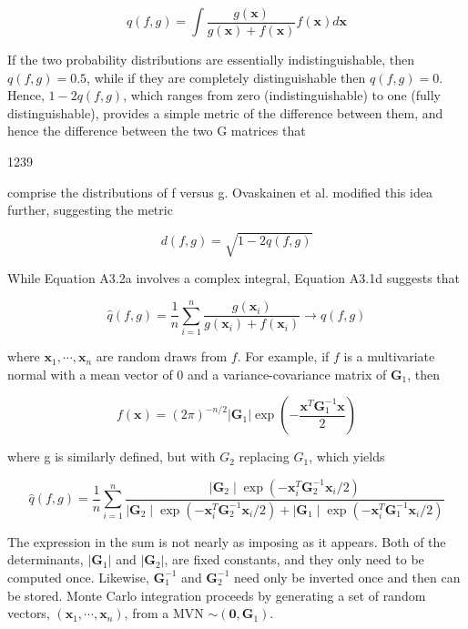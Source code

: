 \documentclass{article}
\begin{document}
\begin{equation}
q(f,g)=\int\frac{g(\mathbf{x})}{g(\mathbf{x})+f(\mathbf{x})}f(\mathbf{x})d\mathbf{x}
\end{equation}

If the two probability distributions are essentially indistinguishable, then  $ q(f,g) = 0.5 $, while if they are completely distinguishable then  $ q(f,g) = 0 $. Hence,  $ 1 - 2q(f,g) $, which ranges from zero (indistinguishable) to one (fully distinguishable), provides a simple metric of the difference between them, and hence the difference between the two G matrices that

1239

comprise the distributions of f versus g. Ovaskainen et al. modified this idea further, suggesting the metric

\begin{equation}
d(f,g)=\sqrt{1-2q(f,g)}
\end{equation}

While Equation A3.2a involves a complex integral, Equation A3.1d suggests that

\begin{equation}
\widehat{q}(f,g)=\frac{1}{n}\sum_{i=1}^{n}\frac{g(\mathbf{x}_{i})}{g(\mathbf{x}_{i})+f(\mathbf{x}_{i})}\rightarrow q(f,g)
\end{equation}

where  $ \mathbf{x}_1, \cdots, \mathbf{x}_n $ are random draws from  $ f $. For example, if  $ f $ is a multivariate normal with a mean vector of 0 and a variance-covariance matrix of  $ \mathbf{G}_1 $, then

\begin{equation}
f(\mathbf{x})=(2\pi)^{-n/2}|\mathbf{G}_{1}|\exp\left(-\frac{\mathbf{x}^{T}\mathbf{G}_{1}^{-1}\mathbf{x}}{2}\right)
\end{equation}

where g is similarly defined, but with  $ G_{2} $ replacing  $ G_{1} $, which yields

\begin{equation}
\widehat{q}(f,g)=\frac{1}{n}\sum_{i=1}^{n}\frac{\mid\mathbf{G}_{2}\mid\exp\left(-\mathbf{x}_{i}^{T}\mathbf{G}_{2}^{-1}\mathbf{x}_{i}/2\right)}{\mid\mathbf{G}_{2}\mid\exp\left(-\mathbf{x}_{i}^{T}\mathbf{G}_{2}^{-1}\mathbf{x}_{i}/2\right)+\mid\mathbf{G}_{1}\mid\exp\left(-\mathbf{x}_{i}^{T}\mathbf{G}_{1}^{-1}\mathbf{x}_{i}/2\right)}
\end{equation}

The expression in the sum is not nearly as imposing as it appears. Both of the determinants,  $ |\mathbf{G}_1| $ and  $ |\mathbf{G}_2| $, are fixed constants, and they only need to be computed once. Likewise,  $ \mathbf{G}_1^{-1} $ and  $ \mathbf{G}_2^{-1} $ need only be inverted once and then can be stored. Monte Carlo integration proceeds by generating a set of random vectors,  $ (\mathbf{x}_1, \cdots, \mathbf{x}_n) $, from a MVN  $ \sim(\mathbf{0}, \mathbf{G}_1) $.
\end{document}

